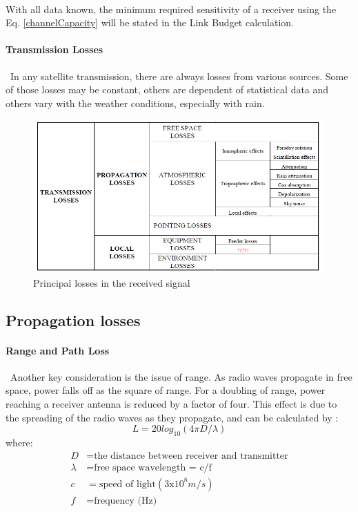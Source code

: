 \paragraph{} With all data known, the minimum required sensitivity of a receiver using the Eq. \ref{channelCapacity} will be stated in the Link Budget calculation.

\paragraph{Transmission Losses}
\ In any satellite transmission, there are always losses from various sources. Some of
those losses may be constant, others are dependent of statistical data and others vary
with the weather conditions, especially with rain.

\begin{figure}[h]
	\includegraphics[scale=0.8]{./sections/SatelliteDept/sections/images/principal_losses}
	\centering
	\caption{Principal losses in the received signal \cite{Jorge2012}}
	\label{principal_losses}
\end{figure}

\subsection{Propagation losses}
\paragraph{Range and Path Loss}
\
Another key consideration is the issue of range. As radio waves propagate in free space, power falls off as the square of range. For a doubling of range, power reaching a receiver antenna is reduced by a factor of four. This effect is due to the spreading of the radio waves as they propagate, and can be calculated by \cite{Note1998}:
\begin{equation}
L=20log_{10}(4\pi D/\lambda)
\label{FSP}
\end{equation}
where:
\begin{align*}
	D&= \text{the distance between receiver and transmitter}\\
	\lambda&= \text{free space wavelength = c/f}\\
	c&= \text{speed of light}(3\mathrm{x}10^8m/s)\\
	f&= \text{frequency (Hz)}
\end{align*}
\clearpage
{}
